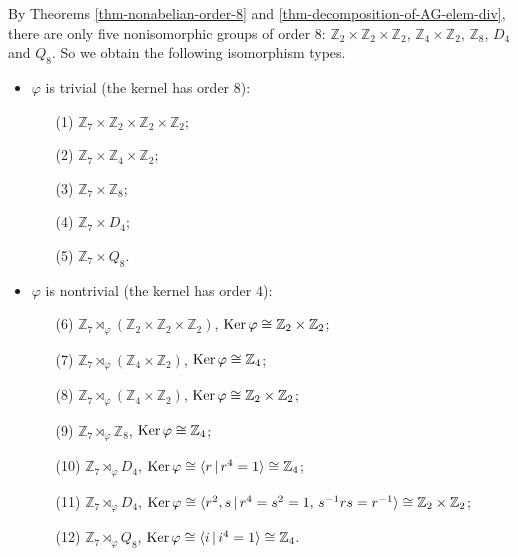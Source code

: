 \begin{example}
	 By Theorems \ref{thm-nonabelian-order-8} and  \ref{thm-decomposition-of-AG-elem-div}, there are only five nonisomorphic groups of order $8$: $\mathbb{Z}_2\times \mathbb{Z}_2\times \mathbb{Z}_2$, $\mathbb{Z}_4\times \mathbb{Z}_2$, $\mathbb{Z}_8$, $D_4$ and $Q_8$. So we obtain the following  isomorphism types.
	\begin{itemize}
		\item $\varphi$ is trivial (the kernel has order $8$):
		\begin{itemize}
			\item[(1)] $\mathbb{Z}_7\times \mathbb{Z}_2\times \mathbb{Z}_2\times \mathbb{Z}_2$;
			\item[(2)] $\mathbb{Z}_7\times \mathbb{Z}_4\times \mathbb{Z}_2$;
			\item[(3)] $\mathbb{Z}_7\times \mathbb{Z}_8$;
			\item[(4)] $\mathbb{Z}_7\times D_4$;
			\item[(5)] $\mathbb{Z}_7\times Q_8$.
		\end{itemize}
		\item $\varphi$ is nontrivial (the kernel has order $4$):
		\begin{itemize}
			\item[(6)] $\mathbb{Z}_7\rtimes_{\varphi} (\mathbb{Z}_2\times \mathbb{Z}_2\times \mathbb{Z}_2)$, $\operatorname{Ker}\varphi \cong \mathbb{Z}_2\times \mathbb{Z}_2$;
			\item[(7)] $\mathbb{Z}_7\rtimes_{\varphi} (\mathbb{Z}_4\times \mathbb{Z}_2)$, $\operatorname{Ker}\varphi \cong \mathbb{Z}_4$;
			\item[(8)] $\mathbb{Z}_7\rtimes_{\varphi} (\mathbb{Z}_4\times \mathbb{Z}_2)$, $\operatorname{Ker}\varphi \cong  \mathbb{Z}_2\times \mathbb{Z}_2$;
			\item[(9)] $\mathbb{Z}_7\rtimes_{\varphi} \mathbb{Z}_8$, $\operatorname{Ker}\varphi \cong \mathbb{Z}_4$;
			\item[(10)] $\mathbb{Z}_7\rtimes_{\varphi} D_4$, $\operatorname{Ker}\varphi \cong \langle r\,|\, r^4=1 \rangle \cong \mathbb{Z}_4$;
			\item[(11)] $\mathbb{Z}_7\rtimes_{\varphi} D_4$, $\operatorname{Ker}\varphi \cong \langle r^2,s\,|\, r^4=s^2=1 ,\, s^{-1}rs = r^{-1}\rangle \cong \mathbb{Z}_2 \times \mathbb{Z}_2$;
			\item[(12)] $\mathbb{Z}_7\rtimes_{\varphi} Q_8$, $\operatorname{Ker}\varphi \cong \langle i\,|\, i^4=1 \rangle \cong \mathbb{Z}_4$.
		\end{itemize}
	\end{itemize}
	

\end{example}
